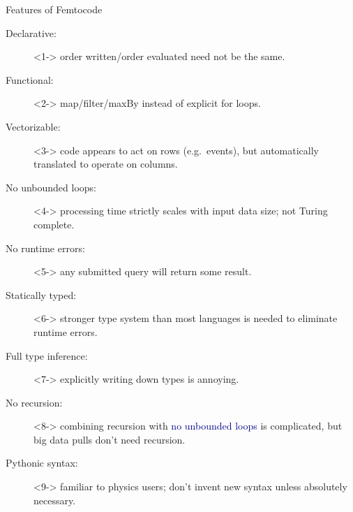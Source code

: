\documentclass{beamer}
\begin{document}
\begin{frame}{Features of Femtocode}
\vspace{0.5 cm}
\begin{description}
\item[Declarative:]<1-> order written/order evaluated need not be the same.
\item[Functional:]<2-> map/filter/maxBy instead of explicit for loops.
\item[Vectorizable:]<3-> code appears to act on rows (e.g.\ events), but automatically translated to operate on columns.
\item[No unbounded loops:]<4-> processing time strictly scales with input data size; not Turing complete.
\item[No runtime errors:]<5-> any submitted query will return some result.
\item[Statically typed:]<6-> stronger type system than most languages is needed to eliminate runtime errors.
\item[Full type inference:]<7-> explicitly writing down types is annoying.
\item[No recursion:]<8-> combining recursion with \textcolor{darkblue}{no unbounded loops} is complicated, but big data pulls don't need recursion.
\item[Pythonic syntax:]<9-> familiar to physics users; don't invent new syntax unless absolutely necessary.
\end{description}
\end{frame}



\end{document}
